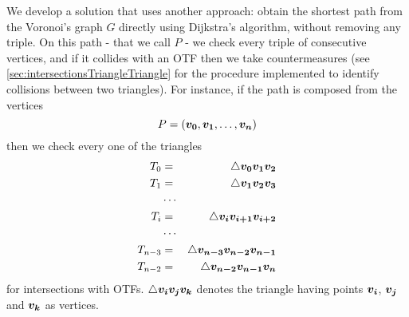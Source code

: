 \documentclass[dissertation.tex]{subfiles}
\begin{document}
We develop a
solution that uses another approach: obtain the shortest path 
from the Voronoi's graph $G$ directly using Dijkstra's algorithm,
without removing any triple. On this path
- that we call $P$ - we
check every triple of consecutive vertices, and if it collides with an
\ac{OTF} then we take countermeasures (see
\cref{sec:intersectionsTriangleTriangle} for the procedure implemented
to identify collisions between two triangles). For instance, if the path
is composed from the vertices
\begin{equation*}
  P=(\boldsymbol{v_0},\boldsymbol{v_1},\dots,\boldsymbol{v_n})
\end{equation*}
then we check every one of the triangles 
\begin{eqnarray*}
T_0 &=& \triangle \boldsymbol{v_0}\boldsymbol{v_1}\boldsymbol{v_2}\\
T_1 &=& \triangle \boldsymbol{v_1}\boldsymbol{v_2}\boldsymbol{v_3}\\
&\cdots&\\
T_i &=& \triangle \boldsymbol{v_i}\boldsymbol{v_{i+1}}\boldsymbol{v_{i+2}}\\
&\cdots&\\
T_{n-3} &=& \triangle \boldsymbol{v_{n-3}}\boldsymbol{v_{n-2}}\boldsymbol{v_{n-1}}\\
T_{n-2} &=& \triangle \boldsymbol{v_{n-2}}\boldsymbol{v_{n-1}}\boldsymbol{v_n}
\end{eqnarray*}
for intersections with \acp{OTF}. $\triangle \boldsymbol{v_i}\boldsymbol{v_j}\boldsymbol{v_k}$
denotes the triangle having points $\boldsymbol{v_i}$, $\boldsymbol{v_j}$ and
$\boldsymbol{v_k}$ as vertices.
 
\end{document}
